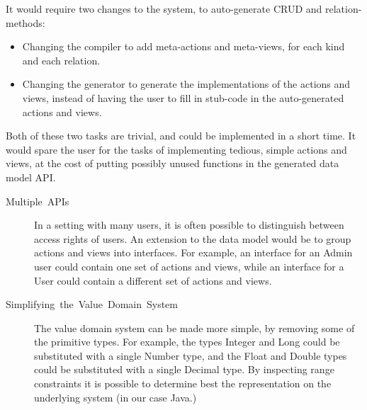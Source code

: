 It would require two changes to the system, to auto-generate CRUD
and relation-methods:
\begin{itemize}
\item Changing the compiler to add meta-actions and meta-views, for each
kind and each relation.
\item Changing the generator to generate the implementations of the actions
and views, instead of having the user to fill in stub-code in the
auto-generated actions and views.
\end{itemize}
Both of these two tasks are trivial, and could be implemented in a
short time. It would spare the user for the tasks of implementing
tedious, simple actions and views, at the cost of putting possibly
unused functions in the generated data model API.
\begin{description}
\item [{Multiple~APIs}] In a setting with many users, it is often possible
to distinguish between access rights of users. An extension to the
data model would be to group actions and views into interfaces. For
example, an interface for an Admin user could contain one set of actions
and views, while an interface for a User could contain a different
set of actions and views.
\item [{Simplifying~the~Value~Domain~System}] The value domain system
can be made more simple, by removing some of the primitive types.
For example, the types Integer and Long could be substituted with
a single Number type, and the Float and Double types could be substituted
with a single Decimal type. By inspecting range constraints it is
possible to determine best the representation on the underlying system
(in our case Java.)\end{description}

